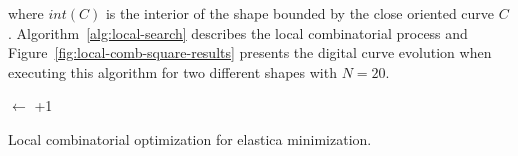\documentclass[runningheads]{llncs}
\begin{document}
where $int(C)$ is the interior of the shape bounded by the close oriented curve $C$. Algorithm~\ref{alg:local-search} describes the local combinatorial process and Figure~\ref{fig:local-comb-square-results} presents the digital curve evolution when executing this algorithm for two different shapes with $N=20$.


\begin{algorithm}
 
 \BlankLine
 \Delta $\longleftarrow$ \Tol+1\;
 \label{alg:local-search} 
 \caption{Local combinatorial optimization for elastica minimization.}
\end{algorithm}
\end{document}
